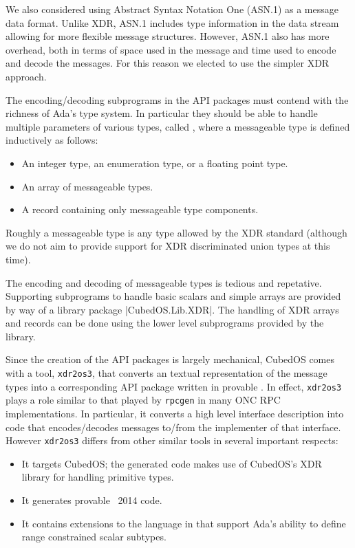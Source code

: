 We also considered using Abstract Syntax Notation One (ASN.1) \cite{asn.1} as a message data
format. Unlike XDR, ASN.1 includes type information in the data stream allowing for more
flexible message structures. However, ASN.1 also has more overhead, both in terms of space used
in the message and time used to encode and decode the messages. For this reason we elected to
use the simpler XDR approach.

The encoding/decoding subprograms in the API packages must contend with the richness of Ada's
type system. In particular they should be able to handle multiple parameters of various types,
called , where a messageable type is defined inductively as follows:

\begin{itemize}
\item An integer type, an enumeration type, or a floating point type.
\item An array of messageable types.
\item A record containing only messageable type components.
\end{itemize}

Roughly a messageable type is any type allowed by the XDR standard (although we do not aim to
provide support for XDR discriminated union types at this time).

The encoding and decoding of messageable types is tedious and repetative. Supporting subprograms
to handle basic scalars and simple arrays are provided by way of a library package
|CubedOS.Lib.XDR|. The handling of XDR arrays and records can be done using the lower level
subprograms provided by the library.

Since the creation of the API packages is largely mechanical, CubedOS comes with a tool,
\texttt{xdr2os3}, that converts an textual representation of the message types into a
corresponding API package written in provable \SPARK. In effect, \texttt{xdr2os3} plays a role
similar to that played by \texttt{rpcgen} in many ONC RPC \cite{rfc-5531} implementations. In
particular, it converts a high level interface description into code that encodes/decodes
messages to/from the implementer of that interface. However \texttt{xdr2os3} differs from other
similar tools in several important respects:

\begin{itemize}
\item It targets CubedOS; the generated code makes use of CubedOS's XDR library for handling
  primitive types.
\item It generates provable \SPARK\ 2014 code.
\item It contains extensions to the language in \cite{rfc-4506} that support Ada's ability to
  define range constrained scalar subtypes.
\end{itemize}

